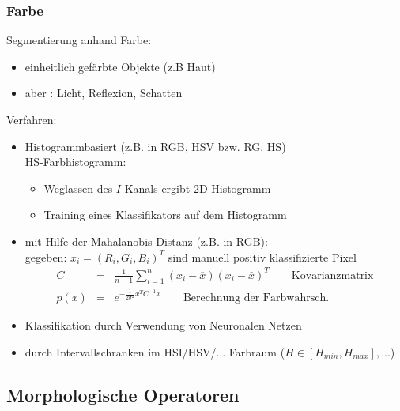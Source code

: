 \subsubsection{Farbe}

Segmentierung anhand Farbe:
\begin{itemize}
\item einheitlich gefärbte Objekte (z.B Haut)
\item aber : Licht, Reflexion, Schatten
\end{itemize}
Verfahren:
\begin{itemize}
\item Histogrammbasiert (z.B. in RGB, HSV bzw. RG, HS) \\ HS-Farbhistogramm:
\begin{itemize}
\item Weglassen des $I$-Kanals ergibt 2D-Histogramm
\item Training eines Klassifikators auf dem Histogramm
\end{itemize}
\item mit Hilfe der Mahalanobis-Distanz (z.B. in RGB): \\ gegeben: $x_i = (R_i,G_i,B_i)^T$ sind manuell positiv klassifizierte Pixel
\begin{eqnarray*}
C &=& \frac{1}{n-1} \sum\limits_{i=1}^n (x_i - \overline{x})(x_i - \overline{x})^T \qquad \textrm{Kovarianzmatrix} \\ p(x) &=& e^{- \frac{1}{2 \sigma^2} x^T C^{-1} x} \qquad \textrm{Berechnung der Farbwahrsch.}
\end{eqnarray*}
\item Klassifikation durch Verwendung von Neuronalen Netzen
\item durch Intervallschranken im HSI/HSV/... Farbraum ($H \in [H_{min}, H_{max}], ...$)
\end{itemize}

\subsection{Morphologische Operatoren}

